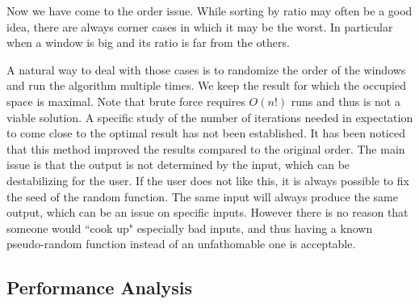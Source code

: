 \documentclass{acmtog}
\begin{document}
Now we have come to the order issue. While sorting by ratio may often be a good idea, there are always corner cases in which it may be the worst. In particular when a window is big and its ratio is far from the others.

A natural way to deal with those cases is to randomize the order of the windows and run the algorithm multiple times. We keep the result for which the occupied space is maximal. Note that brute force requires $O(n!)$ runs and thus is not a viable solution. A specific study of the number of iterations needed in expectation to come close to the optimal result has not been established. It has been noticed that this method improved the results compared to the original order. The main issue is that the output is not determined by the input, which can be destabilizing for the user. If the user does not like this, it is always possible to fix the seed of the random function. The same input will always produce the same output, which can be an issue on specific inputs. However there is no reason that someone would ``cook up" especially bad inputs, and thus having a known pseudo-random function instead of an unfathomable one is acceptable.  



\subsection{Performance Analysis}

\begin{acks}
 
\end{acks}




 
\end{document}
